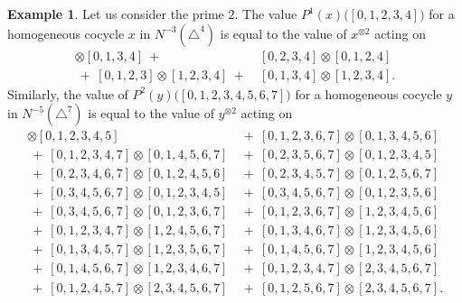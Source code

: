 \documentclass[A4]{amsart}
\theoremstyle{definition}
\newtheorem{example}[theorem]{Example}
\begin{document}
\begin{example}
	Let us consider the prime $2$. The value $P^1(x)\big([0,1,2,3,4]\big)$ for a homogeneous cocycle $x$ in $N^{-3}(\triangle^4)$ is equal to the value of $x^{\otimes 2}$ acting on
	\begin{align*}
	[0, 1, 2, 3] \otimes [0, 1, 3, 4] \ +\  & 
	[0, 2, 3, 4] \otimes [0, 1, 2, 4] \\ \ +\ 
	[0, 1, 2, 3] \otimes [1, 2, 3, 4] \ +\ &
	[0, 1, 3, 4] \otimes [1, 2, 3, 4].
	\end{align*}
	Similarly, the value of $P^2(y)\big([0,1,2,3,4,5,6,7]\big)$ for a homogeneous cocycle $y$ in $N^{-5}(\triangle^7)$ is equal to the value of $y^{\otimes 2}$ acting on
	\begin{align*}
	[0, 1, 2, 5, 6, 7] \otimes [0, 1, 2, 3, 4, 5] & \ +\
	[0, 1, 2, 3, 6, 7] \otimes [0, 1, 3, 4, 5, 6] \\ \ +\ 
	[0, 1, 2, 3, 4, 7] \otimes [0, 1, 4, 5, 6, 7] & \ +\ 
	[0, 2, 3, 5, 6, 7] \otimes [0, 1, 2, 3, 4, 5] \\ \ +\ 
	[0, 2, 3, 4, 6, 7] \otimes [0, 1, 2, 4, 5, 6] & \ +\ 
	[0, 2, 3, 4, 5, 7] \otimes [0, 1, 2, 5, 6, 7] \\ \ +\ 
	[0, 3, 4, 5, 6, 7] \otimes [0, 1, 2, 3, 4, 5] & \ +\ 
	[0, 3, 4, 5, 6, 7] \otimes [0, 1, 2, 3, 5, 6] \\ \ +\ 
	[0, 3, 4, 5, 6, 7] \otimes [0, 1, 2, 3, 6, 7] & \ +\ 
	[0, 1, 2, 3, 6, 7] \otimes [1, 2, 3, 4, 5, 6] \\ \ +\ 
	[0, 1, 2, 3, 4, 7] \otimes [1, 2, 4, 5, 6, 7] & \ +\ 
	[0, 1, 3, 4, 6, 7] \otimes [1, 2, 3, 4, 5, 6] \\ \ +\ 
	[0, 1, 3, 4, 5, 7] \otimes [1, 2, 3, 5, 6, 7] & \ +\ 
	[0, 1, 4, 5, 6, 7] \otimes [1, 2, 3, 4, 5, 6] \\ \ +\ 
	[0, 1, 4, 5, 6, 7] \otimes [1, 2, 3, 4, 6, 7] & \ +\ 
	[0, 1, 2, 3, 4, 7] \otimes [2, 3, 4, 5, 6, 7] \\ \ +\ 
	[0, 1, 2, 4, 5, 7] \otimes [2, 3, 4, 5, 6, 7] & \ +\ 
	[0, 1, 2, 5, 6, 7] \otimes [2, 3, 4, 5, 6, 7].
	\end{align*}
\end{example}
\end{document}
